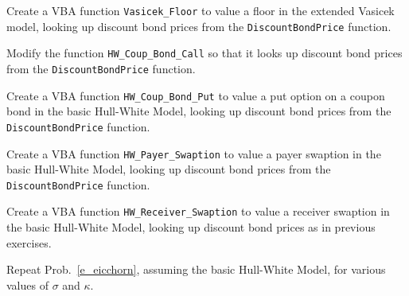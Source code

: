\begin{prob}
\end{prob}\begin{prob} Create a VBA function \verb!Vasicek_Floor! to value a floor in the extended Vasicek model, looking up discount bond prices from the \verb!DiscountBondPrice! function.
\end{prob}\begin{prob} Modify the function \verb!HW_Coup_Bond_Call! so that it looks up discount bond prices from the  \verb!DiscountBondPrice! function.
\end{prob}\begin{prob} Create a VBA function \verb!HW_Coup_Bond_Put! to value a put option on a coupon bond in the basic Hull-White Model, looking up discount bond prices from the \verb!DiscountBondPrice! function.
\end{prob}\begin{prob} Create a VBA function \verb!HW_Payer_Swaption! to value a payer swaption in the basic Hull-White Model, looking up discount bond prices from the \verb!DiscountBondPrice! function.
\end{prob}\begin{prob} Create a VBA function \verb!HW_Receiver_Swaption! to value a receiver swaption in the basic Hull-White Model, looking up discount bond prices as in previous exercises.
\end{prob}\begin{prob} Repeat Prob.~\ref{e_eicchorn}, assuming the basic Hull-White Model, for various values of $\sigma$ and $\kappa$.
\end{prob}